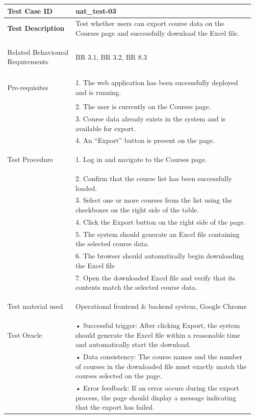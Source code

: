 \begin{table}[h]
\begin{tabularx}{\linewidth}{>{\bfseries}l X}
\hline
Test Case ID & uat\_test-03 \\ \hline

Test Description & Test whether users can export course data on the Courses page and successfully download the Excel file.\\ \hline

Related Behavioural Requirements & BR 3.1, BR 3.2, BR 8.3  \\ \hline

Pre-requisites & 1. The web application has been successfully deployed and is running.\\
& 2. The user is currently on the Courses page.\\
&3. Course data already exists in the system and is available for export.\\
&4. An “Export” button is present on the page. \\ \hline

Test Procedure & 1. Log in and navigate to the Courses page.\\
&2. Confirm that the course list has been successfully loaded.\\
&3. Select one or more courses from the list using the checkboxes on the right side of the table.\\
&4. Click the Export button on the right side of the page. \\ 
&5. The system should generate an Excel file containing the selected course data.\\
& 6. The browser should automatically begin downloading the Excel file\\ 
& 7. Open the downloaded Excel file and verify that its contents match the selected course data.\\ \hline

Test material used & Operational frontend \& backend system, Google Chrome \\ \hline

Test Oracle & • Successful trigger: After clicking Export, the system should generate the Excel file within a reasonable time and automatically start the download.\\
&• Data consistency: The course names and the number of courses in the downloaded file must exactly match the courses selected on the page.\\
&• Error feedback: If an error occurs during the export process, the page should display a message indicating that the export has failed.\\ \hline


\end{tabularx}
\end{table}
